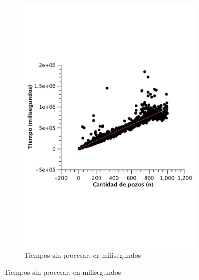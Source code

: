 \begin{figure}[H]
        \centering
\begin{subfigure}[b]{0.5\textwidth}
                \includegraphics[width=\textwidth]{imagenes/ej3-mejor-lineal.pdf}
                \caption{Tiempos sin procesar, en milisegundos}
        \end{subfigure}%


\end{figure}
